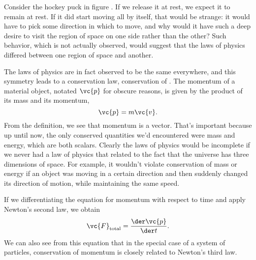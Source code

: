 Consider the hockey puck in figure . If we release it at rest, we expect
it to remain at rest. If it did start moving all by itself, that would be strange: it would
have to pick some direction in which to move, and why would it have such a
deep desire to visit the region of space on one side rather than the other? Such behavior,
which is not actually observed, would suggest that the laws of physics differed between one
region of space and another.


The laws of physics are in fact observed to be the same everywhere, and this
symmetry leads to a conservation law, conservation of .
The momentum of a material object, notated $\vc{p}$ for obscure reasons,
is given by the product of its mass and its momentum,
\begin{equation}
  \vc{p} = m\vc{v}.
\end{equation}
From the definition, we see that momentum is a vector. That's important because up until
now, the only conserved quantities we'd encountered were mass and energy, which are both
scalars. Clearly the laws of physics would be incomplete if we never had a law of physics
that related to the fact that the universe has three dimensions of space.
For example, it wouldn't violate conservation of mass or energy if an object was moving
in a certain direction and then suddenly changed its direction of motion, while maintaining
the same speed.

If we differentiating the equation for momentum with respect to time and apply Newton's
second law, we obtain
\begin{equation}
  \vc{F}_\text{total} = \frac{\der\vc{p}}{\der t}.
\end{equation}
We can also see from this equation that in the special case of a system of particles,
conservation of momentum is closely related to Newton's third law.

